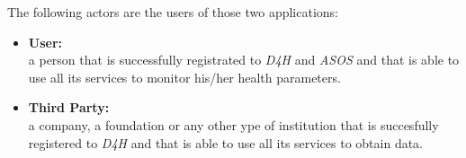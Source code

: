The following actors are the users of those two applications:

\begin{itemize}
	\item{\textbf{User:}\\ a person that is successfully registrated to \textit{D4H} and \textit{ASOS} and that is able to use all its 				services to monitor his/her health parameters.}

	\item{\textbf{Third Party:}\\ a company, a foundation or any other ype of institution that is succesfully registered to \textit{D4H} 		and that is able to use all its services to obtain data.}
\end{itemize}